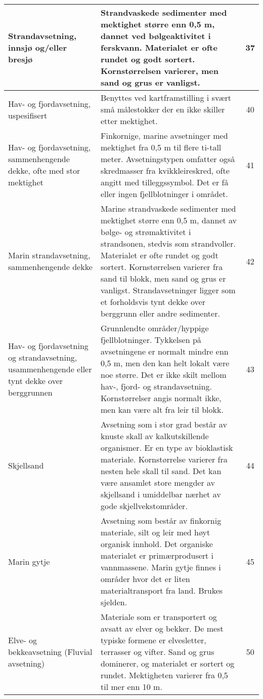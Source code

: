 \begin{longtable}{|p{3.5cm}|p{6.2cm}|c|}
    Strandavsetning, innsjø og/eller bresjø & Strandvaskede sedimenter med mektighet større enn 0,5 m, dannet ved bølgeaktivitet i ferskvann. Materialet er ofte rundet og godt sortert. Kornstørrelsen varierer, men sand og grus er vanligst. & 37 \\ \hline
    Hav- og fjordavsetning, uspesifisert & Benyttes ved kartframstilling i svært små målestokker der en ikke skiller etter mektighet. & 40 \\ \hline
    Hav- og fjordavsetning, sammenhengende dekke, ofte med stor mektighet & Finkornige, marine avsetninger med mektighet fra 0,5 m til flere ti-tall meter. Avsetningstypen omfatter også skredmasser fra kvikkleireskred, ofte angitt med tilleggssymbol. Det er få eller ingen fjellblotninger i området. & 41 \\ \hline
    Marin strandavsetning, sammenhengende dekke & Marine strandvaskede sedimenter med mektighet større enn 0,5 m, dannet av bølge- og strømaktivitet i strandsonen, stedvis som strandvoller. Materialet er ofte rundet og godt sortert. Kornstørrelsen varierer fra sand til blokk, men sand og grus er vanligst. Strandavsetninger ligger som et forholdsvis tynt dekke over berggrunn eller andre sedimenter. & 42 \\ \hline
    Hav- og fjordavsetning  og strandavsetning, usammenhengende eller tynt dekke over berggrunnen & Grunnlendte områder/hyppige fjellblotninger. Tykkelsen på avsetningene er normalt mindre enn 0,5 m, men den kan helt lokalt være noe større. Det er ikke skilt mellom hav-, fjord- og strandavsetning. Kornstørrelser angis normalt ikke, men kan være alt fra leir til blokk. & 43 \\ \hline
    Skjellsand & Avsetning som i stor grad består av knuste skall av kalkutskillende organismer. Er en type av bioklastisk materiale. Kornstørrelse varierer fra nesten hele skall til sand. Det kan være ansamlet store mengder av skjellsand i umiddelbar nærhet av gode skjellvekstområder. & 44 \\ \hline
    Marin gytje & Avsetning som består av finkornig materiale, silt og leir med høyt organisk innhold. Det organiske materialet er primærprodusert i vannmassene. Marin gytje finnes i områder hvor det er liten materialtransport fra land. Brukes sjelden. & 45 \\ \hline
    Elve- og bekkeavsetning (Fluvial avsetning) & Materiale som er transportert og avsatt av elver og bekker. De mest typiske formene er elvesletter, terrasser og vifter. Sand og grus dominerer, og materialet er sortert og rundet. Mektigheten varierer fra 0,5 til mer enn 10 m. & 50 \\ \hline

\end{longtable}
